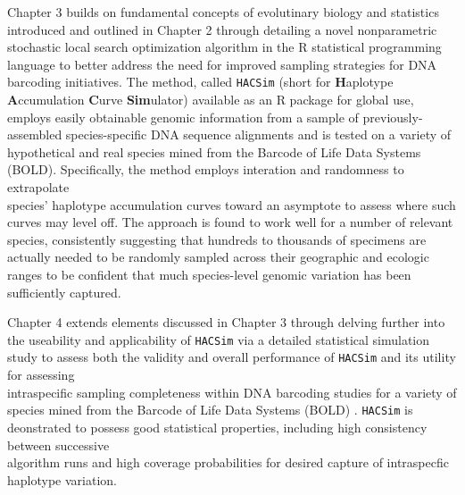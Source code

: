 \vspace{5mm}

Chapter 3 builds on fundamental concepts of evolutinary biology and statistics \\ introduced and outlined in Chapter 2 through detailing a novel nonparametric stochastic local search optimization algorithm in the R statistical programming language to better address the need for improved sampling strategies for DNA barcoding initiatives. The method, called {\tt HACSim} (short for \textbf{H}aplotype \textbf{A}ccumulation \textbf{C}urve \textbf{Sim}ulator) available as an R package for global use, employs easily obtainable genomic information from a sample of previously-assembled species-specific DNA sequence alignments and is tested on a variety of hypothetical and real species mined from the Barcode of Life Data Systems (BOLD). Specifically, the method employs interation and randomness to extrapolate \\ species' haplotype accumulation curves toward an asymptote to assess where such curves may level off. The approach is found to work well for a number of relevant species, consistently suggesting that hundreds to thousands of specimens are actually needed to be randomly sampled across their geographic and ecologic ranges to be confident that much species-level genomic variation has been sufficiently captured.  


\vspace{5mm}

Chapter 4 extends elements discussed in Chapter 3 through delving further into the useability and applicability of {\tt HACSim} via a detailed statistical simulation study to assess both the validity and overall performance of {\tt HACSim} and its utility for assessing \\ intraspecific sampling completeness within DNA barcoding studies for a variety of species mined from the Barcode of Life Data Systems (BOLD) \cite{ratnasingham2007bold}. {\tt HACSim} is deonstrated to possess good statistical properties, including high consistency between successive 
\\ algorithm runs and high coverage probabilities for desired capture of intraspecfic haplotype variation.

\vspace{5mm}

